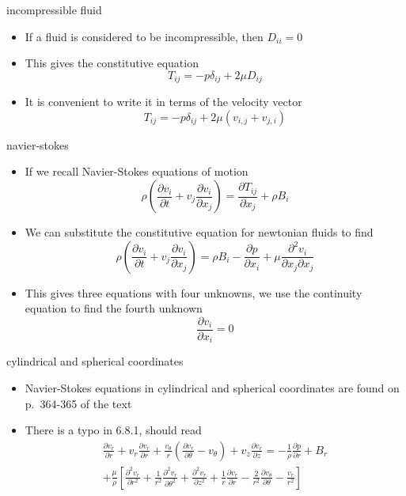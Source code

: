 \documentclass[12pt,handout]{beamer}
\providecommand{\tightlist}{%
  \setlength{\itemsep}{0pt}\setlength{\parskip}{0pt}}
\providecommand{\tightlist}{%
\setlength{\itemsep}{0pt}\setlength{\parskip}{0pt}}
\begin{document}
\begin{frame}{incompressible fluid}
\protect\hypertarget{incompressible-fluid}{}
\begin{itemize}
\item
  If a fluid is considered to be incompressible, then \(D_{ii} = 0\)
\item
  This gives the constitutive equation
  \[T_{ij} = -p \delta_{ij} + 2\mu D_{ij}\]
\item
  It is convenient to write it in terms of the velocity vector
  \[T_{ij} = -p \delta_{ij} + 2\mu (v_{i,j} + v_{j,i})\]
\end{itemize}
\end{frame}

\begin{frame}{navier-stokes}
\protect\hypertarget{navier-stokes}{}
\begin{itemize}
\item
  If we recall Navier-Stokes equations of motion
  \[\rho \left ( \frac{\partial v_i}{\partial t} + v_j \frac{\partial v_i}{\partial x_j}\right) = \frac{\partial T_{ij}}{\partial x_j} + \rho B_i\]
\item
  We can substitute the constitutive equation for newtonian fluids to
  find
  \[\rho \left ( \frac{\partial v_i}{\partial t} + v_j \frac{\partial v_i}{\partial x_j}\right) = \rho B_i - \frac{\partial p}{\partial x_i} + \mu \frac{\partial ^2 v_i}{\partial x_j \partial x_j}\]
\item
  This gives three equations with four unknowns, we use the continuity
  equation to find the fourth unknown
  \[\frac{\partial v_i}{\partial x_i} = 0\]
\end{itemize}
\end{frame}

\begin{frame}{cylindrical and spherical coordinates}
\protect\hypertarget{cylindrical-and-spherical-coordinates}{}
\begin{itemize}
\tightlist
\item
  Navier-Stokes equations in cylindrical and spherical coordinates are
  found on p.~364-365 of the text
\item
  There is a typo in 6.8.1, should read \[\begin{gathered}
    \frac{\partial v_r}{\partial r} + v_r \frac{\partial v_r}{\partial r} + \frac{v_\theta}{r} \left(\frac{\partial v_r}{\partial \theta} - v_\theta\right) + v_z \frac{\partial v_r}{\partial z} = -\frac{1}{\rho} \frac{\partial p}{\partial r} + B_r\\
    + \frac{\mu}{\rho} \left[\frac{\partial ^2 v_r}{\partial r^2} + \frac{1}{r^2}\frac{\partial^2v_r}{\partial \theta^2} + \frac{\partial^2v_r}{\partial z^2} + \frac{1}{r}\frac{\partial v_r}{\partial r} - \frac{2}{r^2}\frac{\partial v_\theta}{\partial \theta} - \frac{v_r}{r^2}\right]
  \end{gathered}\]
\end{itemize}
\end{frame}
\end{document}
